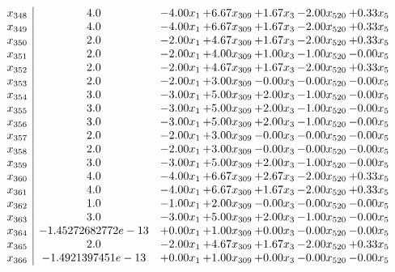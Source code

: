 \documentclass[8pt]{article}
\begin{document}
\[\begin{array}{c| c c@{\hskip 2pt} c@{\hskip 2pt} c@{\hskip 2pt} c@{\hskip 2pt} c@{\hskip 2pt} }
 x_{348}   &  4.0 & -4.00 x_{1} & +  6.67 x_{309} & +  1.67 x_{3} & -2.00 x_{520} & +  0.33 x_{5}\\
 x_{349}   &  4.0 & -4.00 x_{1} & +  6.67 x_{309} & +  1.67 x_{3} & -2.00 x_{520} & +  0.33 x_{5}\\
 x_{350}   &  2.0 & -2.00 x_{1} & +  4.67 x_{309} & +  1.67 x_{3} & -2.00 x_{520} & +  0.33 x_{5}\\
 x_{351}   &  2.0 & -2.00 x_{1} & +  4.00 x_{309} & +  1.00 x_{3} & -1.00 x_{520} & -0.00 x_{5}\\
 x_{352}   &  2.0 & -2.00 x_{1} & +  4.67 x_{309} & +  1.67 x_{3} & -2.00 x_{520} & +  0.33 x_{5}\\
 x_{353}   &  2.0 & -2.00 x_{1} & +  3.00 x_{309} & -0.00 x_{3} & -0.00 x_{520} & -0.00 x_{5}\\
 x_{354}   &  3.0 & -3.00 x_{1} & +  5.00 x_{309} & +  2.00 x_{3} & -1.00 x_{520} & -0.00 x_{5}\\
 x_{355}   &  3.0 & -3.00 x_{1} & +  5.00 x_{309} & +  2.00 x_{3} & -1.00 x_{520} & -0.00 x_{5}\\
 x_{356}   &  3.0 & -3.00 x_{1} & +  5.00 x_{309} & +  2.00 x_{3} & -1.00 x_{520} & -0.00 x_{5}\\
 x_{357}   &  2.0 & -2.00 x_{1} & +  3.00 x_{309} & -0.00 x_{3} & -0.00 x_{520} & -0.00 x_{5}\\
 x_{358}   &  2.0 & -2.00 x_{1} & +  3.00 x_{309} & -0.00 x_{3} & -0.00 x_{520} & -0.00 x_{5}\\
 x_{359}   &  3.0 & -3.00 x_{1} & +  5.00 x_{309} & +  2.00 x_{3} & -1.00 x_{520} & -0.00 x_{5}\\
 x_{360}   &  4.0 & -4.00 x_{1} & +  6.67 x_{309} & +  2.67 x_{3} & -2.00 x_{520} & +  0.33 x_{5}\\
 x_{361}   &  4.0 & -4.00 x_{1} & +  6.67 x_{309} & +  1.67 x_{3} & -2.00 x_{520} & +  0.33 x_{5}\\
 x_{362}   &  1.0 & -1.00 x_{1} & +  2.00 x_{309} & -0.00 x_{3} & -0.00 x_{520} & -0.00 x_{5}\\
 x_{363}   &  3.0 & -3.00 x_{1} & +  5.00 x_{309} & +  2.00 x_{3} & -1.00 x_{520} & -0.00 x_{5}\\
 x_{364}   &  -1.45272682772e-13 & +  0.00 x_{1} & +  1.00 x_{309} & +  0.00 x_{3} & -0.00 x_{520} & -0.00 x_{5}\\
 x_{365}   &  2.0 & -2.00 x_{1} & +  4.67 x_{309} & +  1.67 x_{3} & -2.00 x_{520} & +  0.33 x_{5}\\
 x_{366}   &  -1.4921397451e-13 & +  0.00 x_{1} & +  1.00 x_{309} & +  0.00 x_{3} & -0.00 x_{520} & -0.00 x_{5}\\

\end{array}\]
\end{document}

